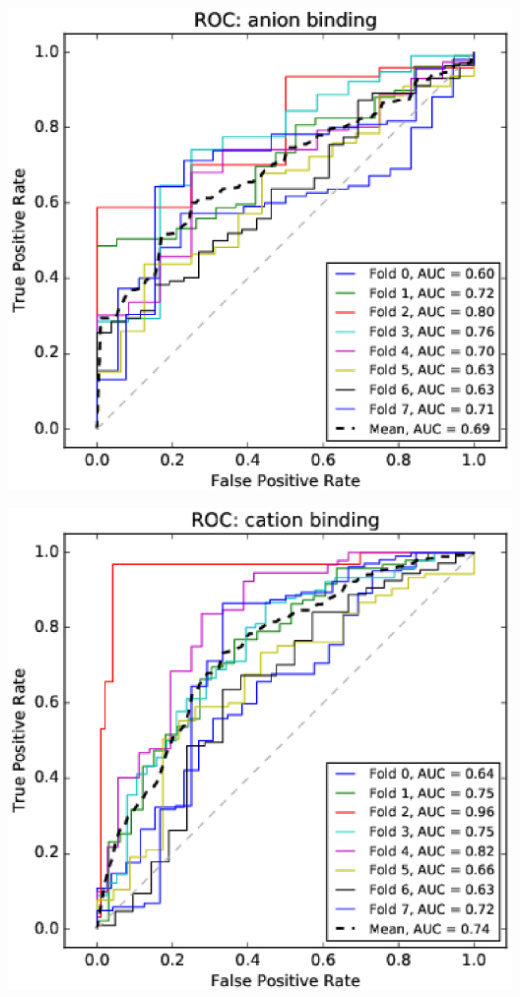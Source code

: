 \documentclass[11pt,twoside,a4paper]{book}
\newenvironment{Figure}
  {\par\medskip\noindent\minipage{\linewidth}}
  {\endminipage\par\medskip}
\begin{document}
\begin{multicols}{2}
\begin{Figure}\begin{center}\includegraphics[width=\linewidth]{figures/roc_anion_binding}\label{fig:roc_anion_binding}\end{center}\end{Figure}
\begin{Figure}\begin{center}\includegraphics[width=\linewidth]{figures/roc_cation_binding}\label{fig:roc_cation_binding}\end{center}\end{Figure}

\end{multicols}
\end{document}
